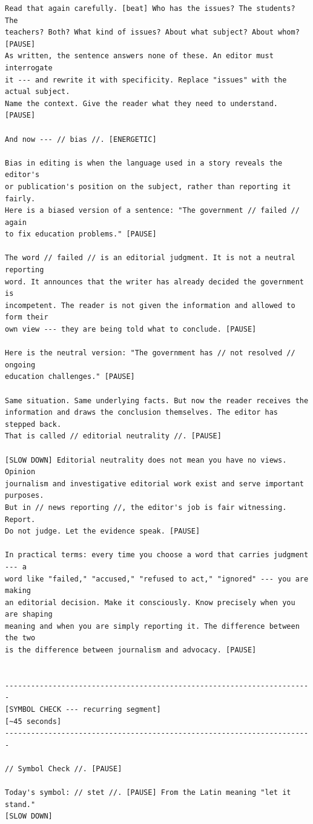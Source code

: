 {\begin{Verbatim}
Read that again carefully. [beat] Who has the issues? The students? The
teachers? Both? What kind of issues? About what subject? About whom? [PAUSE]
As written, the sentence answers none of these. An editor must interrogate
it --- and rewrite it with specificity. Replace "issues" with the actual subject.
Name the context. Give the reader what they need to understand. [PAUSE]

And now --- // bias //. [ENERGETIC]

Bias in editing is when the language used in a story reveals the editor's
or publication's position on the subject, rather than reporting it fairly.
Here is a biased version of a sentence: "The government // failed // again
to fix education problems." [PAUSE]

The word // failed // is an editorial judgment. It is not a neutral reporting
word. It announces that the writer has already decided the government is
incompetent. The reader is not given the information and allowed to form their
own view --- they are being told what to conclude. [PAUSE]

Here is the neutral version: "The government has // not resolved // ongoing
education challenges." [PAUSE]

Same situation. Same underlying facts. But now the reader receives the
information and draws the conclusion themselves. The editor has stepped back.
That is called // editorial neutrality //. [PAUSE]

[SLOW DOWN] Editorial neutrality does not mean you have no views. Opinion
journalism and investigative editorial work exist and serve important purposes.
But in // news reporting //, the editor's job is fair witnessing. Report.
Do not judge. Let the evidence speak. [PAUSE]

In practical terms: every time you choose a word that carries judgment --- a
word like "failed," "accused," "refused to act," "ignored" --- you are making
an editorial decision. Make it consciously. Know precisely when you are shaping
meaning and when you are simply reporting it. The difference between the two
is the difference between journalism and advocacy. [PAUSE]


-----------------------------------------------------------------------
[SYMBOL CHECK --- recurring segment]
[~45 seconds]
-----------------------------------------------------------------------

// Symbol Check //. [PAUSE]

Today's symbol: // stet //. [PAUSE] From the Latin meaning "let it stand."
[SLOW DOWN]


\end{Verbatim}}
